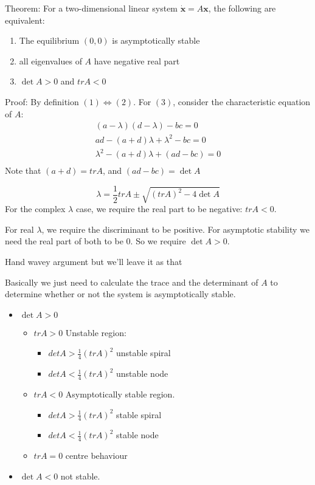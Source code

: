 \documentclass{/home/janmebows/Documents/LatexTemplates/myassignment}
\begin{document}
Theorem:
For a two-dimensional linear system $\dot{\mathbf{x}}= A \mathbf{x}$, the following are equivalent:

\begin{enumerate}
    \item The equilibrium $(0,0)$ is asymptotically stable
    \item all eigenvalues of $A$ have negative real part
    \item $\det A> 0$ and $tr A < 0$
\end{enumerate}

Proof:
By definition $(1) \Leftrightarrow (2)$.
For $(3)$, consider the characteristic equation of $A$:
\begin{align*}
    (a-\lambda) (d-\lambda) - bc = 0\\
    ad - (a+d)\lambda + \lambda ^2  - bc =0\\
    \lambda ^2  - (a+d)\lambda +(ad- bc) =0\\
\end{align*}
Note that $(a+d) = tr A$, and $(ad-bc) = \det A$

\[\lambda = \frac12 trA \pm \sqrt{(tr A)^2 - 4\det A}\]
For the complex $\lambda$ case, we require the real part to be negative: $tr A <0$.

For real $\lambda$, we require the discriminant to be positive. For asymptotic stability we need the real part of both to be $0$. So we require $\det A > 0$.


Hand wavey argument but we'll leave it as that


Basically we just need to calculate the trace and the determinant of $A$ to determine whether or not the system is asymptotically stable.
\begin{itemize}
    \item $\det A > 0$
    \begin{itemize}
         \item $tr A > 0$ Unstable region:
         \begin{itemize}
             \item $det A > \frac14 (tr A)^2$ unstable spiral
             \item $det A < \frac14 (tr A)^2$ unstable node
         \end{itemize}
         \item $tr A < 0$ Asymptotically stable region.
         \begin{itemize}
             \item $det A > \frac14 (tr A)^2$ stable spiral
             \item $det A < \frac14 (tr A)^2$ stable node
         \end{itemize}
         \item $tr A = 0$ centre behaviour
     \end{itemize} 
    \item $\det A < 0$ not stable.
\end{itemize}
\end{document}
